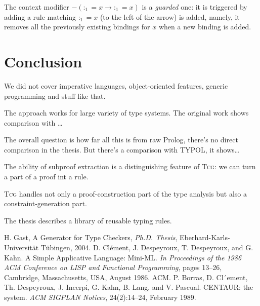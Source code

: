 \documentclass[a4paper,12pt]{article}
\newcommand{\Tcg}{\textsc{Tcg}}
\begin{document}
The context modifier $-(:_1 = x \rightarrow :_1 = x)$ is a \emph{guarded} one: it is triggered by adding a rule matching $:_1 = x$ (to the left of the arrow) is added, namely, it removes all the previously existing bindings for $x$ when a new binding is added.

\section{Conclusion}

We did not cover imperative languages, object-oriented features, generic programming and stuff like that.

The approach works for large variety of type systems. The original work shows comparison with \dots

The overall question is how far all this is from raw Prolog, there's no direct comparison in the thesis. But there's a comparison with TYPOL, it shows\dots

The ability of subproof extraction is a distinguishing feature of \Tcg{}: we can turn a part of a proof int a rule.

\Tcg{} handles not only a proof-construction part of the type analysis but also a constraint-generation part.

The thesis describes a library of reusable typing rules.

\begin{thebibliography}{99}
	 H. Gast, A Generator for Type Checkers, \textit{Ph.D. Thesis}, Eberhard-Karls-Universit\"at T\"ubingen, 2004.
	 D. Cl\'{e}ment, J. Despeyroux, T. Despeyroux, and G. Kahn. A Simple Applicative Language: Mini-ML. \textit{In Proceedings of the 1986 ACM Conference on LISP and Functional Programming}, pages 13–26, Cambridge, Massachusetts, USA, August 1986. ACM.
	 P. Borras, D. Cl\ ́ement, Th. Despeyroux, J. Incerpi, G. Kahn, B. Lang, and V. Pascual. CENTAUR: the system. \textit{ACM SIGPLAN Notices}, 24(2):14–24, February 1989.

\end{thebibliography}
\end{document}
